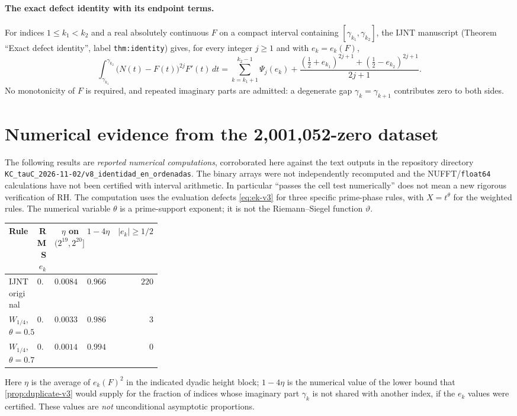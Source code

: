 \documentclass[11pt,a4paper]{article}
\numberwithin{equation}{section}
\theoremstyle{definition}
\theoremstyle{remark}
\begin{document}
\paragraph{The exact defect identity with its endpoint terms.}
For indices $1\le k_1<k_2$ and a real absolutely continuous $F$ on a
compact interval containing $[\gamma_{k_1},\gamma_{k_2}]$, the IJNT
manuscript \cite{CasanaIJNT} (Theorem ``Exact defect identity'', label
\texttt{thm:identity}) gives, for every integer $j\ge1$ and with
$e_k=e_k(F)$,
\begin{equation}\label{eq:IJNTidentity}
\int_{\gamma_{k_1}}^{\gamma_{k_2}}\bigl(N(t)-F(t)\bigr)^{2j}F'(t)\,dt
=\sum_{k=k_1+1}^{k_2-1}\Psi_j(e_k)
+\frac{(\frac12+e_{k_1})^{2j+1}+(\frac12-e_{k_2})^{2j+1}}{2j+1}.
\end{equation}
No monotonicity of $F$ is required, and repeated imaginary parts are
admitted: a degenerate gap $\gamma_k=\gamma_{k+1}$ contributes zero to
both sides.

\section{Numerical evidence from the 2,001,052-zero dataset}\label{sec:v9-data}
The following results are \emph{reported numerical computations},
corroborated here against the text outputs in the repository directory
\texttt{KC\_tauC\_2026-11-02/v8\_identidad\_en\_ordenadas}.
The binary arrays were not independently recomputed and the
NUFFT/\texttt{float64} calculations have not been certified with
interval arithmetic. In particular ``passes the cell test numerically''
does not mean a new rigorous verification of RH.
The computation uses the evaluation defects \eqref{eq:ek-v3}
for three specific prime-phase rules, with
$X=t^\theta$ for the weighted rules. The numerical variable
$\theta$ is a prime-support exponent; it is not the
Riemann--Siegel function $\vartheta$.

\begin{center}\scriptsize
\begin{tabular}{@{}p{0.30\linewidth}rrrr@{}}
\toprule
Rule & RMS $e_k$ & $\eta$ on $(2^{19},2^{20}]$ & $1-4\eta$ & $|e_k|\ge1/2$\\
\midrule
IJNT original & $0.0910$ & $0.00840$ & $0.9664$ & $220$\\
$W_{1/4}$, $\theta=0.5$ & $0.0569$ & $0.00330$ & $0.9868$ & $3$\\
$W_{1/4}$, $\theta=0.7$ & $\mathbf{0.0381}$ & $0.00149$ & $\mathbf{0.9941}$ & $0$\\
\bottomrule
\end{tabular}
\end{center}
Here $\eta$ is the average of $e_k(F)^2$ in the indicated dyadic
height block; $1-4\eta$ is the numerical value of the lower bound
that \cref{prop:duplicate-v3} would supply for the fraction of
indices whose imaginary part $\gamma_k$ is not shared with another index, if the $e_k$ values were certified.
These values are \emph{not} unconditional asymptotic proportions.
\end{document}
